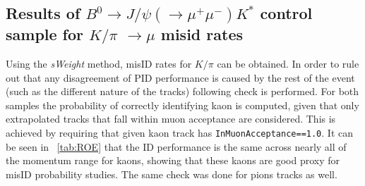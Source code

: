\subsection{Results of $B^{0} \rightarrow J/\psi(\rightarrow \mu^{+} \mu^{-}) K^{*}$ control sample for $K/\pi$ $\rightarrow \mu$ misid rates }
Using the \textit{sWeight} method, misID rates for $K/\pi$ can be obtained. In order to rule out that any disagreement of \gls{PID} performance is caused by the rest of the event (such as the different nature of the tracks) following check is performed. For both samples the probability of correctly identifying kaon is computed, given that only extrapolated tracks that fall within muon acceptance are considered. This is achieved by requiring that given kaon track has \texttt{InMuonAcceptance==1.0}. It can be seen in ~\autoref{tab:ROE} that the ID performance is the same across nearly all of the momentum range for kaons, showing that these kaons are good proxy for misID probability studies. The same check was done for pions tracks as well. 



